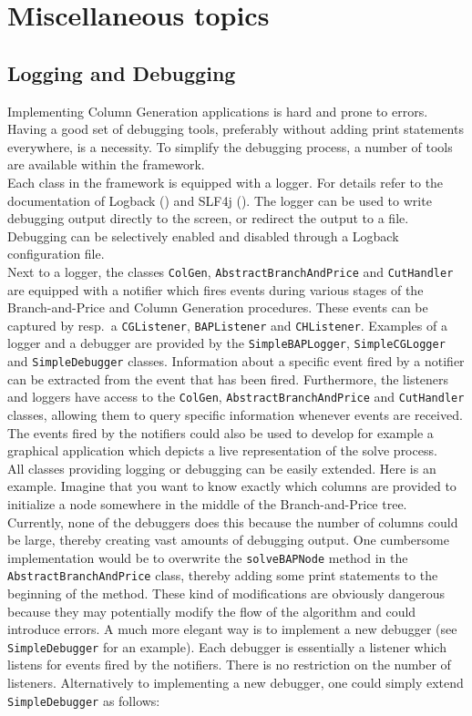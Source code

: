 \documentclass[a4paper]{article}
\newcommand{\code}[1]{\lstinline[language=java, style=seminar]!#1!}
\begin{document}
\section{Miscellaneous topics}

\subsection{Logging and Debugging}
Implementing Column Generation applications is hard and prone to errors. Having a good set of debugging tools, preferably without adding print statements everywhere, is a necessity. To simplify the debugging process, a number of tools are available within the framework.\\
Each class in the framework is equipped with a logger. For details refer to the documentation of Logback (\cite{logback}) and SLF4j (\cite{slf4j}). The logger can be used to write debugging output directly to the screen, or redirect the output to a file. Debugging can be selectively enabled and disabled through a Logback configuration file.\\
Next to a logger, the classes \code{ColGen}, \code{AbstractBranchAndPrice} and \code{CutHandler} are equipped with a notifier which fires events during various stages of the Branch-and-Price and Column Generation procedures. These events can be captured by resp.\ a \code{CGListener}, \code{BAPListener} and \code{CHListener}. Examples of a logger and a debugger are provided by the \code{SimpleBAPLogger}, \code{SimpleCGLogger} and \code{SimpleDebugger} classes. Information about a specific event fired by a notifier can be extracted from the event that has been fired. Furthermore, the listeners and loggers have access to the \code{ColGen}, \code{AbstractBranchAndPrice} and \code{CutHandler} classes, allowing them to query specific information whenever events are received. The events fired by the notifiers could also be used to develop for example a graphical application which depicts a live representation of the solve process.\\
All classes providing logging or debugging can be easily extended. Here is an example. Imagine that you want to know exactly which columns are provided to initialize a node somewhere in the middle of the Branch-and-Price tree. Currently, none of the debuggers does this because the number of columns could be large, thereby creating vast amounts of debugging output. One cumbersome implementation would be to overwrite the \code{solveBAPNode} method in the \code{AbstractBranchAndPrice} class, thereby adding some print statements to the beginning of the method. These kind of modifications are obviously dangerous because they may potentially modify the flow of the algorithm and could introduce errors. A much more elegant way is to implement a new debugger (see \code{SimpleDebugger} for an example). Each debugger is essentially a listener which listens for events fired by the notifiers. There is no restriction on the number of listeners. Alternatively to implementing a new debugger, one could simply extend \code{SimpleDebugger} as follows:
\end{document}
